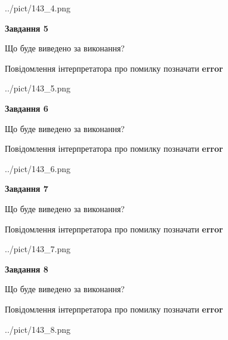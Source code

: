 \documentclass[12pt, ukrainian]{article}
\begin{document}
{\begin{center}
	{../pict/143_4.png}
\end{center}
\newpage

{\begin {center}\textbf{Завдання 5}\end {center}}\par
Що буде виведено за виконання? \par
Повідомлення інтерпретатора про помилку позначати \textbf{error}

\begin{center}
	{../pict/143_5.png}
\end{center}
\newpage

{\begin {center}\textbf{Завдання 6}\end {center}}\par
Що буде виведено за виконання? \par
Повідомлення інтерпретатора про помилку позначати \textbf{error}

\begin{center}
	{../pict/143_6.png}
\end{center}
\newpage

{\begin {center}\textbf{Завдання 7}\end {center}}\par
Що буде виведено за виконання? \par
Повідомлення інтерпретатора про помилку позначати \textbf{error}

\begin{center}
	{../pict/143_7.png}
\end{center}
\newpage

{\begin {center}\textbf{Завдання 8}\end {center}}\par
Що буде виведено за виконання? \par
Повідомлення інтерпретатора про помилку позначати \textbf{error}

\begin{center}
	{../pict/143_8.png}
\end{center}
\newpage

}
\end{document}
